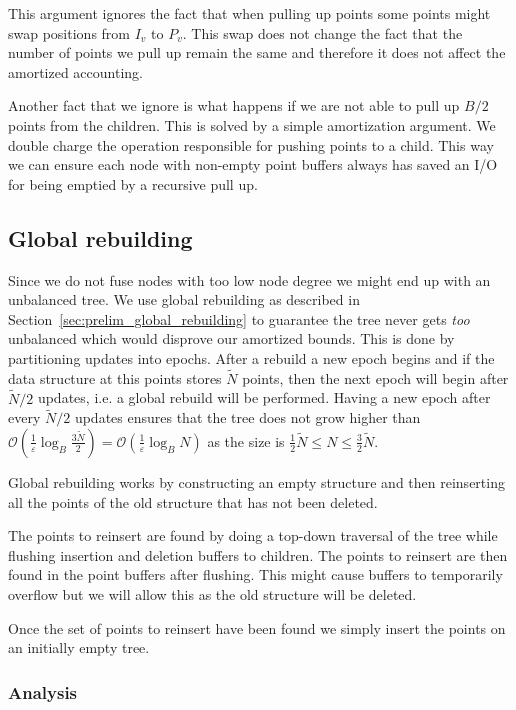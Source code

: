 \documentclass[twoside,11pt,openright]{report}
\def \epsilon {\varepsilon}
\def \bar {\widetilde}
\begin{document}
This argument ignores the fact that when pulling up points some points might swap positions from $I_v$ to $P_v$. This swap does not change the fact that the number of points we pull up remain the same and therefore it does not affect the amortized accounting.

Another fact that we ignore is what happens if we are not able to pull up $B/2$ points from the children. This is solved by a simple amortization argument. We double charge the operation responsible for pushing points to a child. This way we can ensure each node with non-empty point buffers always has saved an I/O for being emptied by a recursive pull up.

\subsection{Global rebuilding}
Since we do not fuse nodes with too low node degree we might end up with an unbalanced tree. We use global rebuilding as described in Section~\ref{sec:prelim_global_rebuilding} to guarantee the tree never gets \textit{too} unbalanced which would disprove our amortized bounds. This is done by partitioning updates into epochs. After a rebuild a new epoch begins and if the data structure at this points stores $\bar{N}$ points, then the next epoch will begin after $\bar{N}/2$ updates, i.e. a global rebuild will be performed.
Having a new epoch after every $\bar{N}/2$ updates ensures that the tree does not grow higher than $\mathcal{O}\left(\frac{1}{\epsilon}\log_B\frac{3\bar{N}}{2}\right) = \mathcal{O}\left(\frac{1}{\epsilon}\log_B N\right)$ as the size is $\frac{1}{2}\bar{N} \leq N \leq \frac{3}{2}\bar{N}$.

Global rebuilding works by constructing an empty structure and then reinserting all the points of the old structure that has not been deleted.

The points to reinsert are found by doing a top-down traversal of the tree while flushing insertion and deletion buffers to children. The points to reinsert are then found in the point buffers after flushing. This might cause buffers to temporarily overflow but we will allow this as the old structure will be deleted.

Once the set of points to reinsert have been found we simply insert the points on an initially empty tree.

\subsubsection*{Analysis}
\end{document}
